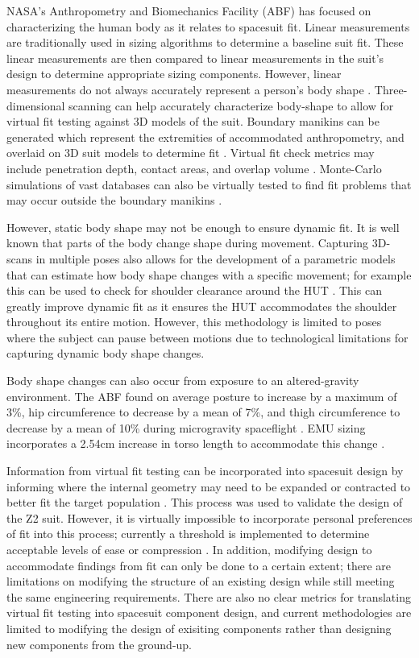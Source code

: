 \documentclass[defaultstyle,11pt]{comps}
\begin{document}
NASA's Anthropometry and Biomechanics Facility (ABF) has focused on characterizing the human body as it relates to spacesuit fit.
Linear measurements are traditionally used in sizing algorithms to determine a baseline suit fit.
These linear measurements are then compared to linear measurements in the suit's design to determine appropriate sizing components.
However, linear measurements do not always accurately represent a person's body shape \citep{Margerum2010}.
Three-dimensional scanning can help accurately characterize body-shape to allow for virtual fit testing against 3D models of the suit.
Boundary manikins can be generated which represent the extremities of accommodated anthropometry, and overlaid on 3D suit models to determine fit \citep{Margerum2010}.
Virtual fit check metrics may include penetration depth, contact areas, and overlap volume \citep{Kim2019}.
Monte-Carlo simulations of vast databases can also be virtually tested to find fit problems that may occur outside the boundary manikins \citep{Kim2019}.

However, static body shape may not be enough to ensure dynamic fit.
It is well known that parts of the body change shape during movement.
Capturing 3D-scans in multiple poses also allows for the development of a parametric models that can estimate how body shape changes with a specific movement; for example this can be used to check for shoulder clearance around the HUT \citep{Kim2016}.
This can greatly improve dynamic fit as it ensures the HUT accommodates the shoulder throughout its entire motion.
However, this methodology is limited to poses where the subject can pause between motions due to technological limitations for capturing dynamic body shape changes.

Body shape changes can also occur from exposure to an altered-gravity environment.
The ABF found on average posture to increase by a maximum of 3\%, hip circumference to decrease by a mean of 7\%, and thigh circumference to decrease by a mean of 10\% during microgravity spaceflight \citep{Kim2019}.
EMU sizing incorporates a 2.54cm increase in torso length to accommodate this change \citep{Thornton1987}.

Information from virtual fit testing can be incorporated into spacesuit design by informing where the internal geometry may need to be expanded or contracted to better fit the target population \citep{Kim2019}.
This process was used to validate the design of the Z2 suit.
However, it is virtually impossible to incorporate personal preferences of fit into this process; currently a threshold is implemented to determine acceptable levels of ease or compression \citep{Kim2019}.
In addition, modifying design to accommodate findings from fit can only be done to a certain extent; there are limitations on modifying the structure of an existing design while still meeting the same engineering requirements.
There are also no clear metrics for translating virtual fit testing into spacesuit component design, and current methodologies are limited to modifying the design of exisiting components rather than designing new components from the ground-up.
\end{document}
